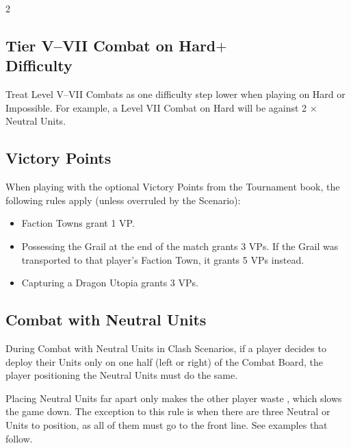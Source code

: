 \begin{multicols*}{2}
\subsection*{Tier V--VII Combat on Hard$+$\\Difficulty}

Treat Level V--VII Combats as one difficulty step lower when playing on Hard or Impossible.
For example, a Level VII Combat on Hard will be against 2 ×  Neutral Units.

\subsection*{Victory Points}

When playing with the optional Victory Points from the Tournament book, the following rules apply (unless overruled by the Scenario):
\begin{itemize}
  \item Faction Towns grant 1 VP.
  \item Possessing the Grail at the end of the match grants 3 VPs. If the Grail was transported to that player's Faction Town, it grants 5 VPs instead.
  \item Capturing a Dragon Utopia grants 3 VPs.
\end{itemize}

\subsection*{Combat with Neutral Units}

During Combat with Neutral Units in Clash Scenarios, if a player decides to deploy their Units only on one half (left or right) of the Combat Board, the player positioning the Neutral Units must do the same.

Placing Neutral Units far apart only makes the other player waste , which slows the game down.
The exception to this rule is when there are three Neutral  or  Units to position, as all of them must go to the front line.
See examples that follow.

\end{multicols*}

